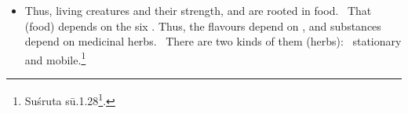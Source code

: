 \documentclass[12pt]{article}
\begin{document}
\begin{itemize}
    
   
    
    \item [1.28] Thus, living creatures and their strength,
 and  are rooted in food.  That
(food) depends on the six . Thus, the flavours depend
on , and substances depend on medicinal herbs. 
There are two kinds of them (herbs):  stationary and mobile.\footnote{Suśruta
sū.1.28\footcites[I, 21]{shar-susr}[7]{susr-trikamji2004}.}
\end{itemize}

\nocite{adri-engl}


\newpage


    \printshorthands

    \printbibliography[notkeyword=edition,
        notkeyword=shorthand]
    
    
    \newpage
    
    \printindex[lexical]
    
\end{document}
